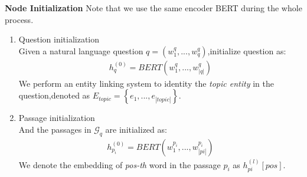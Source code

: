 \documentclass[sigconf]{acmart}
\begin{document}
	\textbf{Node Initialization}
	Note that 	we use the same encoder BERT during the whole process.
	\begin{enumerate}[(1)]
		\item Question initialization\\
		Given a natural language question $q = (w_1^q,...,w_q^q)$,initialize question as:
		\begin{displaymath}
			\begin{aligned}
				h_q^{(0)} = BERT(w_1^q,...,w_{|q|}^q)				
			\end{aligned}
		\end{displaymath}
		We perform an entity linking system\cite{ferragina2011fast} to identity the \emph{topic entity} in the question,denoted as $E_{topic}=\left\{e_1,...,e_{|topic|}\right\}$.
		
		\item Passage initialization\\
		And the passages in $\mathcal{G}_q$ are initialized as:
		\begin{displaymath}
			\begin{aligned}
				h_{p_i}^{(0)} = BERT(w_1^{p_i},...,w_{|pi|}^{p_i})				
			\end{aligned}
		\end{displaymath}	
		We denote  the embedding of  \emph{pos-th} word in the passage $p_{i}$ as $h^{(l)}_{pi}[pos]$.
		
	\end{enumerate}
	
\end{document}
